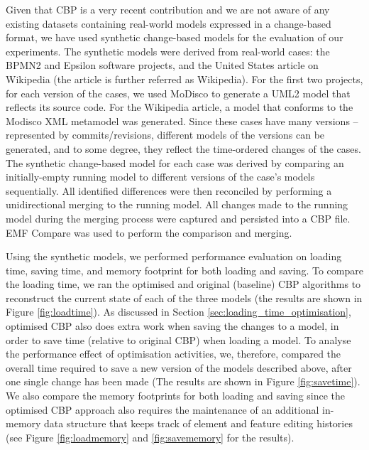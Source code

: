 \documentclass{llncs}
\begin{document}
    Given that CBP is a very recent contribution and we are not aware of any existing datasets containing real-world models expressed in a change-based format, we have used synthetic change-based models for the evaluation of our experiments. The synthetic models were derived from real-world cases: the BPMN2 \cite{eclipse2017bpmn2,eclipse2018bpmn2git} and Epsilon \cite{eclipse2017epsilon,eclipse2018epsilongit} software projects, and the United States article \cite{wikipedia2018us} on Wikipedia (the article is further referred as Wikipedia). For the first two projects, for each version of the cases, we used MoDisco \cite{DBLP:journals/infsof/BruneliereCDM14} to generate a UML2 \cite{eclipse2017uml2} model that reflects its source code. For the Wikipedia article, a model that conforms to the Modisco XML metamodel \cite{eclipse2018modiscoxml} was generated. Since these cases have many versions -- represented by commits/revisions, different models of the versions can be generated, and to some degree, they reflect the time-ordered changes of the cases. The synthetic change-based model for each case was derived by comparing an initially-empty running model to different versions of the case's models sequentially. All identified differences were then reconciled by performing a unidirectional merging to the running model. All changes made to the running model during the merging process were captured and persisted into a CBP file. EMF Compare was used \cite{eclipse2017compare} to perform the comparison and merging.
    
    Using the synthetic models, we performed performance evaluation on loading time, saving time, and memory footprint for both loading and saving. To compare the loading time, we ran the optimised and original (baseline) CBP algorithms to reconstruct the current state of each of the three models (the results are shown in Figure \ref{fig:loadtime}). As discussed in Section \ref{sec:loading_time_optimisation}, optimised CBP also does extra work when saving the changes to a model, in order to save time (relative to original CBP) when loading a model. To analyse the performance effect of optimisation activities, we, therefore, compared the overall time required to save a new version of the models described above, after one single change has been made (The results are shown in Figure \ref{fig:savetime}). We also compare the memory footprints for both loading and saving since the optimised CBP approach also requires the maintenance of an additional in-memory data structure that keeps track of element and feature editing histories (see Figure \ref{fig:loadmemory} and \ref{fig:savememory} for the results). 
    
\end{document}
